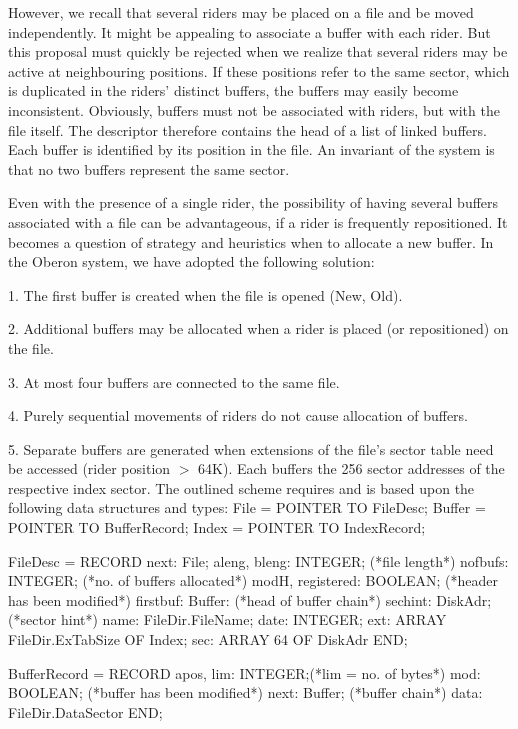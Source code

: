 However, we recall that several riders may be placed on a file and be moved independently. It might be appealing to associate a buffer with each rider. But this proposal must quickly be rejected when we realize that several riders may be active at neighbouring positions. If these positions refer to the same sector, which is duplicated in the riders' distinct buffers, the buffers may easily become inconsistent. Obviously, buffers must not be associated with riders, but with the file itself. The descriptor therefore contains the head of a list of linked buffers. Each buffer is identified by its position in the file. An invariant of the system is that no two buffers represent the same sector.

Even with the presence of a single rider, the possibility of having several buffers associated with a file can be advantageous, if a rider is frequently repositioned. It becomes a question of strategy and heuristics when to allocate a new buffer. In the Oberon system, we have adopted the following solution:
\smallskip
\item{1.} The first buffer is created when the file is opened (New, Old).
\item{2.} Additional buffers may be allocated when a rider is placed (or repositioned) on the file.
\item{3.} At most four buffers are connected to the same file.
\item{4.} Purely sequential movements of riders do not cause allocation of buffers.
\item{5.} Separate buffers are generated when extensions of the file's sector table need be accessed (rider position $>$ 64K). Each buffers the 256 sector addresses of the respective index sector.
\smallskip
\noindent The outlined scheme requires and is based upon the following data structures and types:
\begintt
File = POINTER TO FileDesc;
Buffer = POINTER TO BufferRecord;
Index = POINTER TO IndexRecord;

FileDesc = RECORD next: File;
             aleng, bleng: INTEGER; (*file length*)
             nofbufs: INTEGER; (*no. of buffers allocated*)
             modH, registered: BOOLEAN; (*header has been modified*)
             firstbuf: Buffer: (*head of buffer chain*)
             sechint: DiskAdr; (*sector hint*)
             name: FileDir.FileName;
             date: INTEGER;
             ext: ARRAY FileDir.ExTabSize OF Index;
             sec: ARRAY 64 OF DiskAdr
           END;
           
BufferRecord = RECORD apos, lim: INTEGER;(*lim = no. of bytes*)
                 mod: BOOLEAN; (*buffer has been modified*)
                 next: Buffer; (*buffer chain*)
                 data: FileDir.DataSector
               END;

